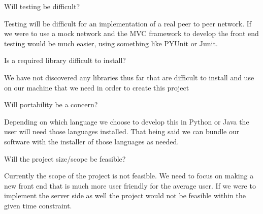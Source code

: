 \documentclass{article}
\begin{document}
Will testing be difficult?

Testing will be difficult for an implementation of a real peer to peer network. If we were to use a mock network and the MVC framework to develop the front end testing would be much easier, using something like PYUnit or Junit.

Is a required library difficult to install?

We have not discovered any libraries thus far that are difficult to install and use on our machine that we need in order to create this project

Will portability be a concern?

Depending on which language we choose to develop this in Python or Java the user will need those languages installed. That being said we can bundle our software with the installer of those languages as needed.

Will the project size/scope be feasible?

Currently the scope of the project is not feasible. We need to focus on making a new front end that is much more user friendly for the average user. If we were to implement the server side as well the project would not be feasible within the given time constraint.
\end{document}
